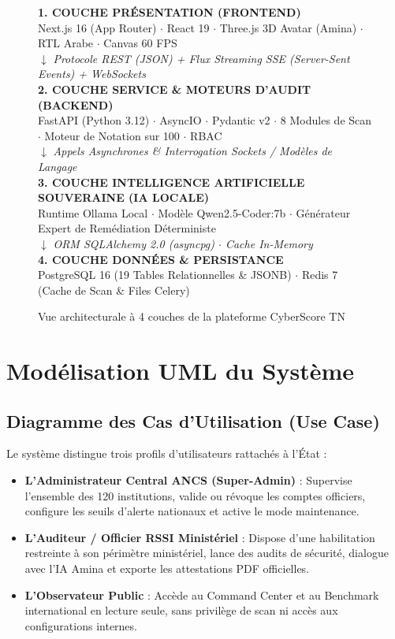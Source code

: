 \begin{figure}[!htbp]
\centering
\begin{tcolorbox}[colback=gray!5,colframe=tekupPurple,arc=1mm,title=\textbf{Architecture Modulaire à 4 Couches de CyberScore TN}]
\centering
\textbf{\large 1. COUCHE PRÉSENTATION (FRONTEND)}\\[1mm]
Next.js 16 (App Router) $\cdot$ React 19 $\cdot$ Three.js 3D Avatar (Amina) $\cdot$ RTL Arabe $\cdot$ Canvas 60 FPS\\
$\downarrow$ \textit{\small Protocole REST (JSON) + Flux Streaming SSE (Server-Sent Events) + WebSockets}\\[2mm]
\textbf{\large 2. COUCHE SERVICE \& MOTEURS D'AUDIT (BACKEND)}\\[1mm]
FastAPI (Python 3.12) $\cdot$ AsyncIO $\cdot$ Pydantic v2 $\cdot$ 8 Modules de Scan $\cdot$ Moteur de Notation sur 100 $\cdot$ RBAC\\
$\downarrow$ \textit{\small Appels Asynchrones \& Interrogation Sockets / Modèles de Langage}\\[2mm]
\textbf{\large 3. COUCHE INTELLIGENCE ARTIFICIELLE SOUVERAINE (IA LOCALE)}\\[1mm]
Runtime Ollama Local $\cdot$ Modèle Qwen2.5-Coder:7b $\cdot$ Générateur Expert de Remédiation Déterministe\\
$\downarrow$ \textit{\small ORM SQLAlchemy 2.0 (asyncpg) $\cdot$ Cache In-Memory}\\[2mm]
\textbf{\large 4. COUCHE DONNÉES \& PERSISTANCE}\\[1mm]
PostgreSQL 16 (19 Tables Relationnelles \& JSONB) $\cdot$ Redis 7 (Cache de Scan \& Files Celery)
\end{tcolorbox}
\caption{Vue architecturale à 4 couches de la plateforme CyberScore TN}
\label{fig:archi_4_couches}
\end{figure}

\section{Modélisation UML du Système}

\subsection{Diagramme des Cas d'Utilisation (Use Case)}
Le système distingue trois profils d'utilisateurs rattachés à l'État :
\begin{itemize}
    \item \textbf{L'Administrateur Central ANCS (Super-Admin)} : Supervise l'ensemble des 120 institutions, valide ou révoque les comptes officiers, configure les seuils d'alerte nationaux et active le mode maintenance.
    \item \textbf{L'Auditeur / Officier RSSI Ministériel} : Dispose d'une habilitation restreinte à son périmètre ministériel, lance des audits de sécurité, dialogue avec l'IA Amina et exporte les attestations PDF officielles.
    \item \textbf{L'Observateur Public} : Accède au Command Center et au Benchmark international en lecture seule, sans privilège de scan ni accès aux configurations internes.
\end{itemize}

